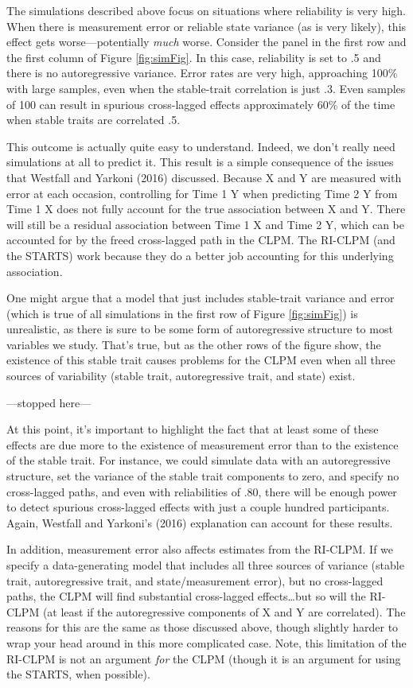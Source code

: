 \documentclass[
  english,
  man,floatsintext]{apa6}
\begin{document}
The simulations described above focus on situations where reliability is very high. When there is measurement error or reliable state variance (as is very likely), this effect gets worse---potentially \emph{much} worse. Consider the panel in the first row and the first column of Figure \ref{fig:simFig}. In this case, reliability is set to .5 and there is no autoregressive variance. Error rates are very high, approaching 100\% with large samples, even when the stable-trait correlation is just .3. Even samples of 100 can result in spurious cross-lagged effects approximately 60\% of the time when stable traits are correlated .5.

This outcome is actually quite easy to understand. Indeed, we don't really need simulations at all to predict it. This result is a simple consequence of the issues that Westfall and Yarkoni (2016) discussed. Because X and Y are measured with error at each occasion, controlling for Time 1 Y when predicting Time 2 Y from Time 1 X does not fully account for the true association between X and Y. There will still be a residual association between Time 1 X and Time 2 Y, which can be accounted for by the freed cross-lagged path in the CLPM. The RI-CLPM (and the STARTS) work because they do a better job accounting for this underlying association.

One might argue that a model that just includes stable-trait variance and error (which is true of all simulations in the first row of Figure \ref{fig:simFig}) is unrealistic, as there is sure to be some form of autoregressive structure to most variables we study. That's true, but as the other rows of the figure show, the existence of this stable trait causes problems for the CLPM even when all three sources of variability (stable trait, autoregressive trait, and state) exist.

---stopped here---

At this point, it's important to highlight the fact that at least some of these effects are due more to the existence of measurement error than to the existence of the stable trait. For instance, we could simulate data with an autoregressive structure, set the variance of the stable trait components to zero, and specify no cross-lagged paths, and even with reliabilities of .80, there will be enough power to detect spurious cross-lagged effects with just a couple hundred participants. Again, Westfall and Yarkoni's (2016) explanation can account for these results.

In addition, measurement error also affects estimates from the RI-CLPM. If we specify a data-generating model that includes all three sources of variance (stable trait, autoregressive trait, and state/measurement error), but no cross-lagged paths, the CLPM will find substantial cross-lagged effects\ldots but so will the RI-CLPM (at least if the autoregressive components of X and Y are correlated). The reasons for this are the same as those discussed above, though slightly harder to wrap your head around in this more complicated case. Note, this limitation of the RI-CLPM is not an argument \emph{for} the CLPM (though it is an argument for using the STARTS, when possible).
\end{document}
